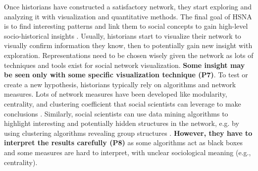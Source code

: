 Once historians have constructed a satisfactory network, they start exploring and analyzing it with visualization and quantitative methods.
The final goal of HSNA is to find interesting patterns and link them to social concepts to gain high-level socio-historical insights \cite{freeman_development_2004, wetherellHistoricalSocialNetwork1998}.
Usually, historians start to visualize their network to visually confirm information they know, then to potentially gain new insight with exploration.
Representations need to be chosen wisely given the network as lots of techniques and tools exist for social network visualization. \textbf{Some insight may be seen only with some specific visualization technique (P7)}.
To test or create a new hypothesis, historians typically rely on algorithms and network measures.
Lots of network measures have been developed like modularity, centrality, and clustering coefficient that social scientists can leverage to make conclusions \cite{scottSocialNetworkAnalysis1988}.
Similarly, social scientists can use data mining algorithms to highlight interesting and potentially hidden structures in the network, e.g. by using clustering algorithms revealing group structures \cite{brandesModularityClustering2008}.
\textbf{However, they have to interpret the results carefully (P8)} as some algorithms act as black boxes and some measures are hard to interpret, with unclear sociological meaning (e.g., centrality).
